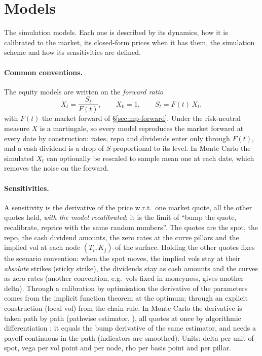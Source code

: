 \section{Models}\label{sec:mp-models}
The simulation models. Each one is described by its dynamics, how it is calibrated to the market, its closed-form
prices when it has them, the simulation scheme and how its sensitivities are defined.

\paragraph{Common conventions.} The equity models are written on the \emph{forward ratio}
\[
  X_t = \frac{S_t}{F(t)},\qquad X_0 = 1,\qquad S_t = F(t)\,X_t ,
\]
with $F(t)$ the market forward of \S\ref{sec:mp-forward}. Under the risk-neutral measure $X$ is a martingale, so
every model reproduces the market forward at every date by construction: rates, repo and dividends enter only through
$F(t)$, and a cash dividend is a drop of $S$ proportional to its level. In Monte Carlo the simulated $X_t$ can optionally
be rescaled to sample mean one at each date, which removes the noise on the forward.

\paragraph{Sensitivities.} A sensitivity is the derivative of the price w.r.t.\ one market quote, all the other quotes
held, \emph{with the model recalibrated}: it is the limit of ``bump the quote, recalibrate, reprice with the same random
numbers''. The quotes are the spot, the repo, the cash dividend amounts, the zero rates at the curve pillars and the
implied vol at each node $(T_i, K_j)$ of the surface. Holding the other quotes fixes the scenario convention: when the spot
moves, the implied vols stay at their \emph{absolute} strikes (sticky strike), the dividends stay as cash amounts and the
curves as zero rates (another convention, e.g.\ vols fixed in moneyness, gives another delta). Through a calibration by
optimisation the derivative of the parameters comes from the implicit function theorem at the optimum; through an
explicit construction (local vol) from the chain rule. In Monte Carlo the derivative is taken path by path (pathwise
estimator, \citealp{giles2006,glasserman2003}), all quotes at once by algorithmic differentiation \citep{savine2018}; it equals
the bump derivative of the same estimator, and needs a payoff continuous in the path (indicators are smoothed). Units:
delta per unit of spot, vega per vol point and per node, rho per basis point and per pillar.


